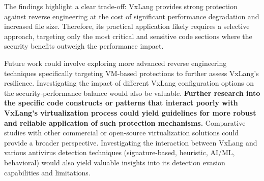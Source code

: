 The findings highlight a clear trade-off: VxLang provides strong protection against reverse engineering at the cost of significant performance degradation and increased file size. Therefore, its practical application likely requires a selective approach, targeting only the most critical and sensitive code sections where the security benefits outweigh the performance impact.

Future work could involve exploring more advanced reverse engineering techniques specifically targeting VM-based protections to further assess VxLang's resilience. Investigating the impact of different VxLang configuration options on the security-performance balance would also be valuable. \textbf{Further research into the specific code constructs or patterns that interact poorly with VxLang's virtualization process could yield guidelines for more robust and reliable application of such protection mechanisms.} Comparative studies with other commercial or open-source virtualization solutions could provide a broader perspective. Investigating the interaction between VxLang and various antivirus detection techniques (signature-based, heuristic, AI/ML, behavioral) would also yield valuable insights into its detection evasion capabilities and limitations.
